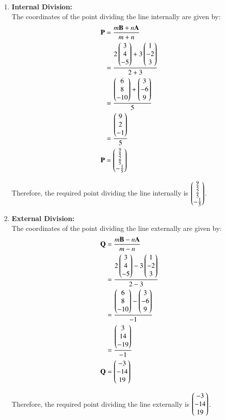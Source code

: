 \documentclass[journal]{IEEEtran}
\begin{document}
\begin{enumerate}
    \item \textbf{Internal Division:} \\
    The coordinates of the point dividing the line internally are given by:
    \begin{align}
    \mathbf{P} &= \frac{m\mathbf{B} + n\mathbf{A}}{m+n}\\
    &= \frac{2\begin{pmatrix}3 \\ 4 \\ -5\end{pmatrix} + 3\begin{pmatrix}1 \\ -2 \\ 3\end{pmatrix}}{2+3}\\
    &= \frac{\begin{pmatrix}6 \\ 8 \\ -10\end{pmatrix} + \begin{pmatrix}3 \\ -6 \\ 9\end{pmatrix}}{5}\\
    &= \frac{\begin{pmatrix}9 \\ 2 \\ -1\end{pmatrix}}{5}\\
    \mathbf{P} &= \begin{pmatrix}\frac{9}{5} \\ \frac{2}{5} \\ -\frac{1}{5}\end{pmatrix}
    \end{align}

    Therefore, the required point dividing the line internally is \(\begin{pmatrix}\frac{9}{5} \\ \frac{2}{5} \\ -\frac{1}{5}\end{pmatrix}\).

    \item \textbf{External Division:} \\
    The coordinates of the point dividing the line externally are given by:
    \begin{align}
    \mathbf{Q} &= \frac{m\mathbf{B} - n\mathbf{A}}{m-n}\\
    &= \frac{2\begin{pmatrix}3 \\ 4 \\ -5\end{pmatrix} - 3\begin{pmatrix}1 \\ -2 \\ 3\end{pmatrix}}{2-3}\\
    &= \frac{\begin{pmatrix}6 \\ 8 \\ -10\end{pmatrix} - \begin{pmatrix}3 \\ -6 \\ 9\end{pmatrix}}{-1}\\
    &= \frac{\begin{pmatrix}3 \\ 14 \\ -19\end{pmatrix}}{-1}\\
    \mathbf{Q} &= \begin{pmatrix}-3 \\ -14 \\ 19\end{pmatrix}
    \end{align}

    Therefore, the required point dividing the line externally is \(\begin{pmatrix}-3 \\ -14 \\ 19\end{pmatrix}\).
\end{enumerate}
\end{document}
